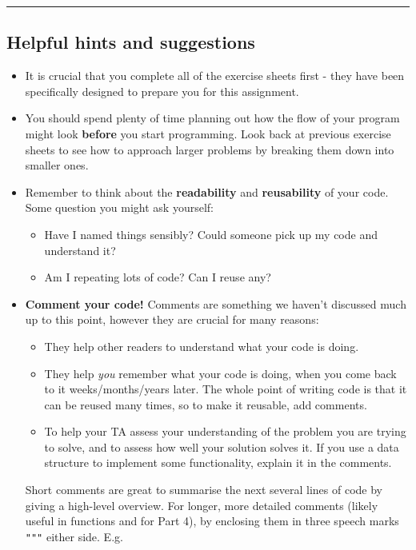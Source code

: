 \documentclass[11pt]{report}
\begin{document}
\vspace{1em}
\hrule
\vspace{1em}

\subsection*{Helpful hints and suggestions}
\begin{itemize}
    \item It is crucial that you complete all of the exercise sheets first - they have been specifically designed to prepare you for this assignment.
	\item You should spend plenty of time planning out how the flow of your program might look \textbf{before} you start programming. Look back at previous exercise sheets to see how to approach larger problems by breaking them down into smaller ones.
	\item Remember to think about the \textbf{readability} and \textbf{reusability} of your code. Some question you might ask yourself:
	\begin{itemize}
		\item Have I named things sensibly? Could someone pick up my code and understand it?
		\item Am I repeating lots of code? Can I reuse any?
	\end{itemize}
	\item \textbf{Comment your code!} Comments are something we haven't discussed much up to this point, however they are crucial for many reasons:
	\begin{itemize}
		\item They help other readers to understand what your code is doing.
		\item They help \emph{you} remember what your code is doing, when you come back to it weeks/months/years later. The whole point of writing code is that it can be reused many times, so to make it reusable, add comments.
		\item To help your TA assess your understanding of the problem you are trying to solve, and to assess how well your solution solves it. If you use a data structure to implement some functionality, explain it in the comments.
	\end{itemize}
	Short comments are great to summarise the next several lines of code by giving a high-level overview. For longer, more detailed comments (likely useful in functions and for Part 4), by enclosing them in three speech marks {\tt """} either side. E.g.
	

\end{itemize}
\end{document}
